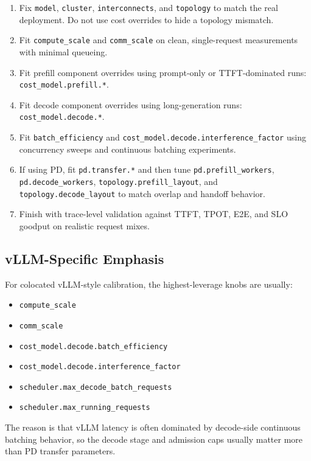 \begin{enumerate}
\item Fix \texttt{model}, \texttt{cluster}, \texttt{interconnects}, and
\texttt{topology} to match the real deployment. Do not use cost overrides to
hide a topology mismatch.
\item Fit \texttt{compute\_scale} and \texttt{comm\_scale} on clean,
single-request measurements with minimal queueing.
\item Fit prefill component overrides using prompt-only or TTFT-dominated runs:
\texttt{cost\_model.prefill.*}.
\item Fit decode component overrides using long-generation runs:
\texttt{cost\_model.decode.*}.
\item Fit \texttt{batch\_efficiency} and
\texttt{cost\_model.decode.interference\_factor} using concurrency sweeps and continuous
batching experiments.
\item If using PD, fit \texttt{pd.transfer.*} and then tune
\texttt{pd.prefill\_workers}, \texttt{pd.decode\_workers},
\texttt{topology.prefill\_layout}, and \texttt{topology.decode\_layout} to match overlap and
handoff behavior.
\item Finish with trace-level validation against TTFT, TPOT, E2E, and SLO
goodput on realistic request mixes.
\end{enumerate}

\subsection{vLLM-Specific Emphasis}

For colocated vLLM-style calibration, the highest-leverage knobs are usually:

\begin{itemize}
\item \texttt{compute\_scale}
\item \texttt{comm\_scale}
\item \texttt{cost\_model.decode.batch\_efficiency}
\item \texttt{cost\_model.decode.interference\_factor}
\item \texttt{scheduler.max\_decode\_batch\_requests}
\item \texttt{scheduler.max\_running\_requests}
\end{itemize}

The reason is that vLLM latency is often dominated by decode-side continuous
batching behavior, so the decode stage and admission caps usually matter more
than PD transfer parameters.

